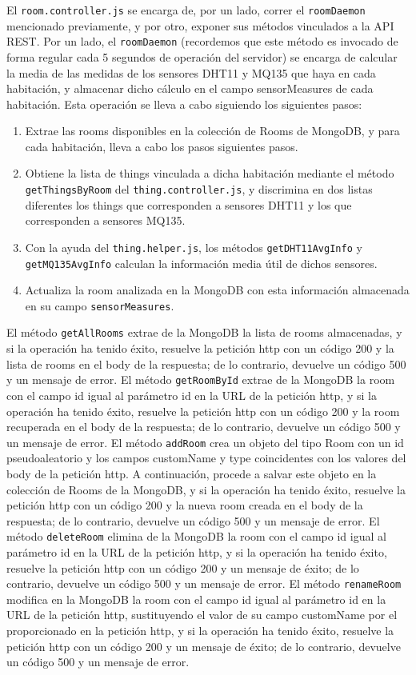 El \verb|room.controller.js| se encarga de, por un lado, correr el \verb|roomDaemon| mencionado previamente, y por otro, exponer sus métodos vinculados a la API REST.
Por un lado, el \verb|roomDaemon| (recordemos que este método es invocado de forma regular cada 5 segundos de operación del servidor) se encarga de calcular la media de las medidas de los sensores DHT11 y MQ135 que haya en cada habitación, y almacenar dicho cálculo en el campo sensorMeasures de cada habitación. Esta operación se lleva a cabo siguiendo los siguientes pasos:
\begin{enumerate}
    \item Extrae las rooms disponibles en la colección de Rooms de MongoDB, y para cada habitación, lleva a cabo los pasos siguientes pasos.
    \item Obtiene la lista de things vinculada a dicha habitación mediante el método \verb|getThingsByRoom| del \verb|thing.controller.js|, y discrimina en dos listas diferentes los things que corresponden a sensores DHT11 y los que corresponden a sensores MQ135.
    \item Con la ayuda del \verb|thing.helper.js|, los métodos \verb|getDHT11AvgInfo| y \verb|getMQ135AvgInfo| calculan la información media útil de dichos sensores.
    \item Actualiza la room analizada en la MongoDB con esta información almacenada en su campo \verb|sensorMeasures|.
\end{enumerate}

\vspace{0.5cm}

El método \verb|getAllRooms| extrae de la MongoDB la lista de rooms almacenadas, y si la operación ha tenido éxito, resuelve la petición http con un código 200 y la lista de rooms en el body de la respuesta; de lo contrario, devuelve un código 500 y un mensaje de error.
El método \verb|getRoomById| extrae de la MongoDB la room con el campo id igual al parámetro id en la URL de la petición http, y si la operación ha tenido éxito, resuelve la petición http con un código 200 y la room recuperada en el body de la respuesta; de lo contrario, devuelve un código 500 y un mensaje de error.
El método \verb|addRoom| crea un objeto del tipo Room con un id pseudoaleatorio y los campos customName y type coincidentes con los valores del body de la petición http. A continuación, procede a salvar este objeto en la colección de Rooms de la MongoDB, y si la operación ha tenido éxito, resuelve la petición http con un código 200 y la nueva room creada en el body de la respuesta; de lo contrario, devuelve un código 500 y un mensaje de error.
El método \verb|deleteRoom| elimina de la MongoDB la room con el campo id igual al parámetro id en la URL de la petición http, y si la operación ha tenido éxito, resuelve la petición http con un código 200 y un mensaje de éxito; de lo contrario, devuelve un código 500 y un mensaje de error.
El método \verb|renameRoom| modifica en la MongoDB la room con el campo id igual al parámetro id en la URL de la petición http, sustituyendo el valor de su campo customName por el proporcionado en la petición http, y si la operación ha tenido éxito, resuelve la petición http con un código 200 y un mensaje de éxito; de lo contrario, devuelve un código 500 y un mensaje de error.

